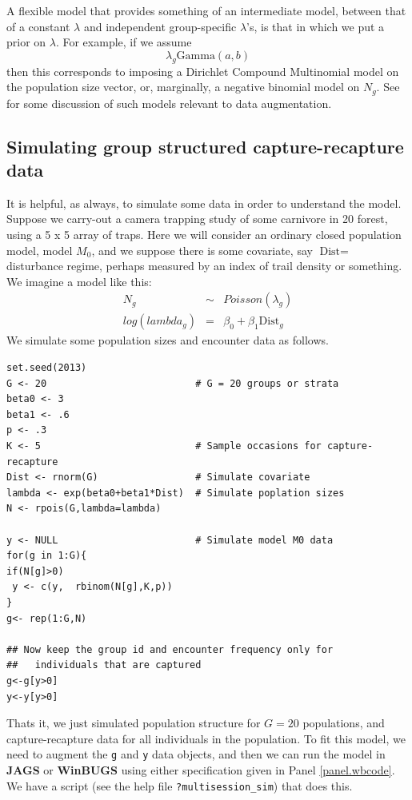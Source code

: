 A flexible model that provides something of an intermediate model,
between that of a constant $\lambda$ and independent group-specific
$\lambda$'s, is that in which we put a prior on $\lambda$. For
example, if we assume
\[
 \lambda_{g} \mbox{Gamma}(a,b)
\]
then this corresponds to imposing a Dirichlet Compound Multinomial
model on the population size vector, or, marginally, a negative
binomial model on $N_{g}$. See \citet{takemura:1999} for some
discussion of such models relevant to data augmentation. 


\subsection{
Simulating group structured 
capture-recapture data
}

It is helpful, as always, to simulate some data in order to understand
the model. Suppose we carry-out a camera trapping study of some
carnivore in 20 forest, using a 5 x 5 array of traps. Here we will
consider an ordinary closed population model, model $M_0$, and we
suppose there is 
some covariate, say $\mbox{Dist} = $ disturbance regime, perhaps measured by an
index of trail density or something.
We imagine a model like this:
\begin{eqnarray*}
N_{g} &\sim& Poisson(\lambda_{g})  \\
log(lambda_{g})& = &\beta_{0} + \beta_{1} \mbox{Dist}_{g} 
\end{eqnarray*}
We simulate some population sizes and encounter data  as
follows.
\begin{verbatim}
set.seed(2013)
G <- 20                          # G = 20 groups or strata
beta0 <- 3
beta1 <- .6
p <- .3
K <- 5                           # Sample occasions for capture-recapture
Dist <- rnorm(G)                 # Simulate covariate
lambda <- exp(beta0+beta1*Dist)  # Simulate poplation sizes 
N <- rpois(G,lambda=lambda)

y <- NULL                        # Simulate model M0 data
for(g in 1:G){
if(N[g]>0)
 y <- c(y,  rbinom(N[g],K,p))
}
g<- rep(1:G,N)

## Now keep the group id and encounter frequency only for
##   individuals that are captured 
g<-g[y>0]
y<-y[y>0]
\end{verbatim}
Thats it,
we just simulated population structure for $G=20$ populations, and
capture-recapture data for all individuals in the population. To fit
this model, we need to augment the \mbox{\tt g} and \mbox{\tt y} data
objects, and then we can run the model in {\bf JAGS} or {\bf WinBUGS}
using either specification given in Panel \ref{panel.wbcode}.
We have a script (see the help file \mbox{\tt ?multisession\_sim})
that does this.



